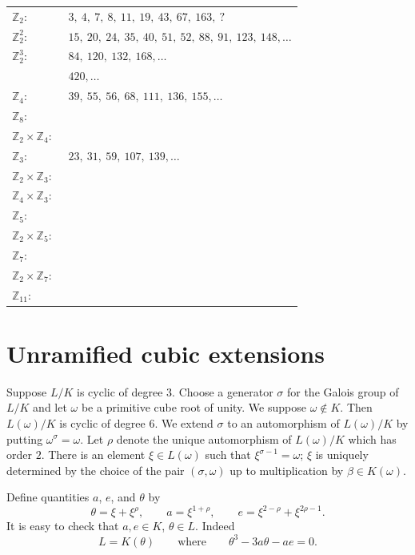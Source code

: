 \begin{center}
\begin{tabular}{ll}
$\mathbb{Z}_{2}$:\ & $3,\ 4,\ 7,\ 8,\ 11,\ 19,\ 43,\ 67,\ 163,\ ?$\\
$\mathbb{Z}_{2}^{2}$:\ & $15,\ 20,\ 24,\ 35,\ 40,\ 51,\ 52,\ 88,\ 91,\ 123,\ 148,\dots$\\
$\mathbb{Z}_{2}^{3}$:\ & $84,\ 120,\ 132,\ 168,\dots$\\
& $420,\dots$\\
$\mathbb{Z}_{4}$:\ & $39,\ 55,\ 56,\ 68,\ 111,\ 136,\ 155,\dots$\\
$\mathbb{Z}_{8}$:\ & \\
$\mathbb{Z}_{2}\times\mathbb{Z}_{4}$:\ &\\
$\mathbb{Z}_{3}$:\ & $23,\ 31,\ 59,\ 107,\ 139,\dots$\\
$\mathbb{Z}_{2}\times\mathbb{Z}_{3}$:\ &\\
$\mathbb{Z}_{4}\times\mathbb{Z}_{3}$:\ &\\
$\mathbb{Z}_{5}$:\ &\\
$\mathbb{Z}_{2}\times\mathbb{Z}_{5}$:\ &\\
$\mathbb{Z}_{7}$:\ &\\
$\mathbb{Z}_{2}\times\mathbb{Z}_{7}$:\ &\\
$\mathbb{Z}_{11}$:\ &
\end{tabular}
\end{center}

\section{Unramified cubic extensions}\label{sec:VII-cubic}

Suppose $L/K$ is cyclic of degree $3$. Choose a generator $\sigma$ for
the Galois group of $L/K$ and let $\omega$ be a primitive cube root of
unity. We suppose $\omega\notin K$. Then $L(\omega)/K$ is cyclic of
degree $6$. We extend $\sigma$ to an automorphism of $L(\omega)/K$ by
putting $\omega^{\sigma}=\omega$. Let $\rho$ denote the unique
automorphism of $L(\omega)/K$ which has order $2$. There is an element
$\xi\in L(\omega)$ such that $\xi^{\sigma-1}=\omega$; $\xi$ is uniquely
determined by the choice of the pair $(\sigma,\omega)$ up to
multiplication by $\beta\in K(\omega)$.

Define quantities $a$, $e$, and $\theta$ by
\[
\theta=\xi+\xi^{\rho},\qquad
a=\xi^{1+\rho},\qquad
e=\xi^{2-\rho}+\xi^{2\rho-1}.
\]
It is easy to check that $a,e\in K$, $\theta\in L$. Indeed
\[
L=K(\theta)\qquad\text{where}\qquad\theta^{3}-3a\theta-ae=0.
\]


